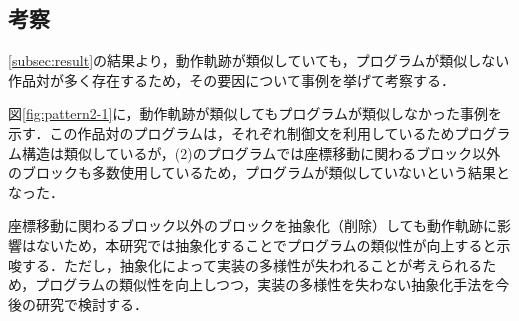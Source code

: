 \documentclass[T,J]{fose} %
\begin{document}
\vspace{-10pt}
\subsection{考察}
\ref{subsec:result}の結果より，動作軌跡が類似していても，プログラムが類似しない作品対が多く存在するため，その要因について事例を挙げて考察する．

図\ref{fig:pattern2-1}に，動作軌跡が類似してもプログラムが類似しなかった事例を示す．この作品対のプログラムは，それぞれ制御文を利用しているためプログラム構造は類似しているが，(2)のプログラムでは座標移動に関わるブロック以外のブロックも多数使用しているため，プログラムが類似していないという結果となった．


座標移動に関わるブロック以外のブロックを抽象化（削除）しても動作軌跡に影響はないため，本研究では抽象化することでプログラムの類似性が向上すると示唆する．ただし，抽象化によって実装の多様性が失われることが考えられるため，プログラムの類似性を向上しつつ，実装の多様性を失わない抽象化手法を今後の研究で検討する．
\end{document}
